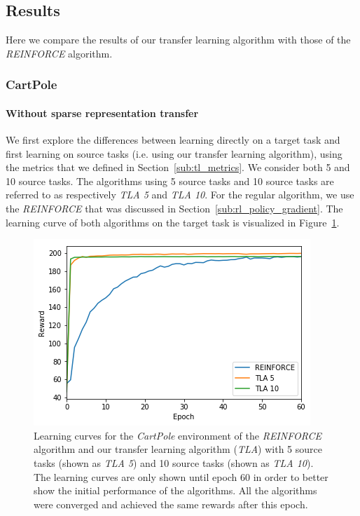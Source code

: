\subsection{Results}
Here we compare the results of our transfer learning algorithm with those of the \textit{REINFORCE} algorithm.
\subsubsection{CartPole} %
\label{sub:cartpole}
\paragraph{Without sparse representation transfer} %
\label{par:cartpole:without_sparse_representation_transfer}
We first explore the differences between learning directly on a target task and first learning on source tasks (i.e. using our transfer learning algorithm), using the metrics that we defined in Section~\ref{sub:tl_metrics}. We consider both 5 and 10 source tasks. The algorithms using 5 source tasks and 10 source tasks are referred to as respectively \textit{TLA 5} and \textit{TLA 10}.
For the regular algorithm, we use the \textit{REINFORCE} that was discussed in Section~\ref{sub:rl_policy_gradient}. The learning curve of both algorithms on the target task is visualized in Figure~\ref{fig:CartPole:reward_target_re-akt5-akt10}.
\begin{figure}[H]
    \centering
    \includegraphics[width=.8\linewidth]{images/results/CartPole/no_sparse_transfer/reward_target_re-akt5-akt10.png}
    \caption[Learning curves for \textit{REINFORCE} and \textit{TLA} for the \emph{CartPole} environment]{Learning curves for the \textit{CartPole} environment of the \textit{REINFORCE} algorithm and our transfer learning algorithm (\textit{TLA}) with 5 source tasks (shown as \textit{TLA 5}) and 10 source tasks (shown as \textit{TLA 10}). The learning curves are only shown until epoch 60 in order to better show the initial performance of the algorithms. All the algorithms were converged and achieved the same rewards after this epoch.}
    \label{fig:CartPole:reward_target_re-akt5-akt10}
\end{figure}
